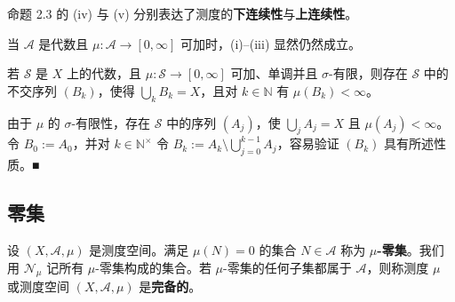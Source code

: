 \begin{remark}

\begin{items}
\item

命题 2.3 的 (iv) 与 (v) 分别表达了测度的\textbf{下连续性}与\textbf{上连续性}。

\item

当 $ \mathcal{A} $ 是代数且 $ \mu\colon \mathcal{A} \to [0,\infty] $ 可加时，(i)–(iii) 显然仍然成立。

\item

若 $ \mathcal{S} $ 是 $ X $ 上的代数，且 $ \mu\colon \mathcal{S} \to [0,\infty] $ 可加、单调并且 $ \sigma $-有限，则存在 $ \mathcal{S} $ 中的不交序列 $ (B_k) $，使得 $ \bigcup_k B_k = X $，且对 $ k \in \mathbb{N} $ 有 $ \mu(B_k) < \infty $。

\proofhead
由于 $ \mu $ 的 $ \sigma $-有限性，存在 $ \mathcal{S} $ 中的序列 $ (A_j) $，使 $ \bigcup_j A_j = X $ 且 $ \mu(A_j) < \infty $。令 $ B_0 := A_0 $，并对 $ k \in \mathbb{N}^{\times} $ 令 $ B_k := A_k \setminus \bigcup_{j=0}^{k-1} A_j $，容易验证 $ (B_k) $ 具有所述性质。\nobreak\hspace{0.35em}■
\end{items}

\end{remark}

\subsection*{零集}

设 $ (X, \mathcal{A}, \mu) $ 是测度空间。满足 $ \mu(N) = 0 $ 的集合 $ N \in \mathcal{A} $ 称为 \textbf{$ \mu $-零集}。我们用 $ \mathcal{N}_\mu $ 记所有 $ \mu $-零集构成的集合。若 $ \mu $-零集的任何子集都属于 $ \mathcal{A} $，则称测度 $ \mu $ 或测度空间 $ (X, \mathcal{A}, \mu) $ 是\textbf{完备的}。

